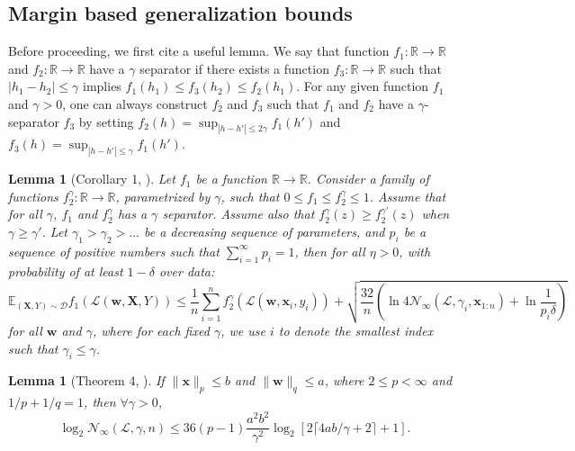 \documentclass[11pt]{article}
\newtheorem{lemma}[theorem]{Lemma}
\newcommand{\w}{\bm{w}}
\newcommand{\x}{\bm{x}}
\newcommand{\R}{\mathbb{R}}
\newcommand{\X}{\bm{X}}
\newcommand{\0}{\mathbf{0}}
\newcommand{\1}{\mathbf{1}}
\newcommand{\cD}{\mathcal{D}}
\newcommand{\cL}{\mathcal{L}}
\newcommand{\cN}{\mathcal{N}}
\newcommand{\bbE}{\mathbb{E}}
\begin{document}
\subsection{Margin based generalization bounds}

Before proceeding, we first cite a useful lemma. We say that function $f_1:\R\rightarrow\R$ and $f_2:\R\rightarrow\R$ have a $\gamma$ separator if there exists a function $f_3:\R\rightarrow\R$ such that $|h_1-h_2|\le\gamma$ implies $f_1(h_1)\le f_3(h_2)\le f_2(h_1)$. For any given function $f_1$ and $\gamma>0$, one can always construct $f_2$ and $f_3$ such that $f_1$ and $f_2$ have a $\gamma$-separator $f_3$ by setting $f_2(h)=\sup_{|h-h'|\le2\gamma}f_1(h')$ and $f_3(h)=\sup_{|h-h'|\le\gamma}f_1(h')$.

\begin{lemma}[Corollary 1, \cite{zhang2002covering}]
\label{lemma: general margin bound}
Let $f_1$ be a function $\R\rightarrow\R$. Consider a family of functions $f_2^\gamma:\R\rightarrow\R$, parametrized by $\gamma$, such that $0\le f_1\le f_2^\gamma\le 1$. Assume that for all $\gamma$, $f_1$ and $f_2^\gamma$ has a $\gamma$ separator. Assume also that $f_2^\gamma(z)\ge f_2^{\gamma'}(z)$ when $\gamma\ge\gamma'$. Let $\gamma_1>\gamma_2>...$ be a decreasing sequence of parameters, and $p_i$ be a sequence of positive numbers such that $\sum_{i=1}^\infty p_i=1$, then for all $\eta>0$, with probability of at least $1-\delta$ over data:
\begin{equation*}
\bbE_{(\X,Y)\sim\cD} f_1(\cL(\w,\X,Y))\le \frac{1}{n}\sum_{i=1}^n f_2^\gamma(\cL(\w,\x_i,y_i))+\sqrt{\frac{32}{n}\left(\ln 4\cN_\infty(\cL,\gamma_i,\x_{1:n})+\ln\frac{1}{p_i \delta}\right)}
\end{equation*}
for all $\w$ and $\gamma$, where for each fixed $\gamma$, we use $i$ to denote the smallest index such that $\gamma_i\le\gamma$.
\end{lemma}

\begin{lemma}[Theorem 4, \cite{zhang2002covering}]
\label{lemma: covering number}
If $\|\x\|_p\le b$ and $\|\w\|_q\le a$, where $2\le p<\infty$ and $1/p+1/q=1$, then $\forall\gamma>0$,
\begin{equation*}
\log_2 \cN_\infty(\cL,\gamma,n)\le 36(p-1)\frac{a^2b^2}{\gamma^2}\log_2[2\lceil 4ab/\gamma+2\rceil+1].
\end{equation*}
\end{lemma}
\end{document}

